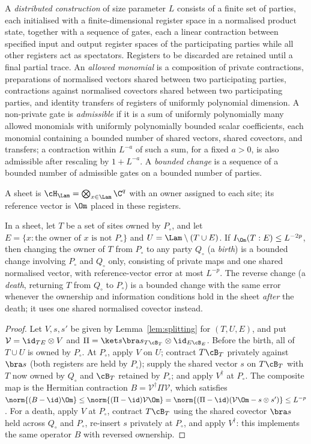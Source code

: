 \precisely
A \emph{distributed construction} of size parameter $L$ consists of a
finite set of parties, each initialised with a finite-dimensional register
space in a normalised product state, together with a sequence of gates,
each a linear contraction between specified input and output register
spaces of the participating parties while all other registers act as
spectators. Registers to be discarded are retained until a final partial
trace. An \emph{allowed monomial} is a composition of private
contractions, preparations of normalised vectors shared between two
participating parties, contractions against normalised covectors shared
between two participating parties, and identity transfers of registers of
uniformly polynomial dimension. A non-private gate is \emph{admissible} if
it is a sum of uniformly polynomially many allowed monomials with
uniformly polynomially bounded scalar coefficients, each monomial
containing a bounded number of shared vectors, shared covectors, and
transfers; a contraction within $L^{-a}$ of such a sum, for a fixed $a>0$,
is also admissible after rescaling by $1+L^{-a}$. A \emph{bounded change}
is a sequence of a bounded number of admissible gates on a bounded number
of parties.

A sheet is $\cH_\Lam=\bigotimes_{x\in\Lam}\C^q$ with an owner assigned to
each site; its reference vector is $\Om$ placed in these registers.

\begin{lemma}\label{lem:birth}
In a sheet, let $T$ be a set of sites owned by $P_\circ$, and let
$E=\{x:\text{the owner of }x\text{ is not }P_\circ\}$ and
$U=\Lam\setminus(T\cup E)$. If $I_\Om(T:E)\le L^{-2p}$, then changing the
owner of $T$ from $P_\circ$ to any party $Q_\circ$ (a \emph{birth}) is a bounded
change involving $P_\circ$ and $Q_\circ$ only, consisting of private maps and one
shared normalised vector, with reference-vector error at most $L^{-p}$.
The reverse change (a \emph{death}, returning $T$ from $Q_\circ$ to
$P_\circ$) is a bounded change with the same error whenever the
ownership and information conditions hold in the sheet \emph{after} the
death; it uses one shared normalised covector instead.
\end{lemma}
\begin{proof}
Let $V,s,s'$ be given by Lemma~\ref{lem:splitting} for $(T,U,E)$, and put
$\mathcal V=\id_{TE}\otimes V$ and $\Pi=\ket s\bra s_{T\cB_T}\otimes\id_{E\cB_E}$.
Before the birth, all of $T\cup U$ is owned by $P_\circ$. At $P_\circ$, apply $V$ on $U$; contract
$T\cB_T$ privately against $\bra s$ (both registers are held by $P_\circ$); supply the shared
vector $s$ on $T\cB_T$ with $T$ now owned by $Q_\circ$ and $\cB_T$ retained by
$P_\circ$; and apply $V^\dagger$ at $P_\circ$. The composite map is the Hermitian
contraction $B=\mathcal V^\dagger\Pi\mathcal V$, which satisfies
$\norm{(B-\id)\Om}\le\norm{(\Pi-\id)\mathcal V\Om}=\norm{(\Pi-\id)(\mathcal V\Om-s\otimes s')}\le L^{-p}$.
For a death, apply $V$ at $P_\circ$, contract $T\cB_T$ using the shared covector $\bra s$
held across $Q_\circ$ and $P_\circ$, re-insert $s$ privately at $P_\circ$, and
apply $V^\dagger$: this implements the same operator $B$ with reversed ownership.
\end{proof}

